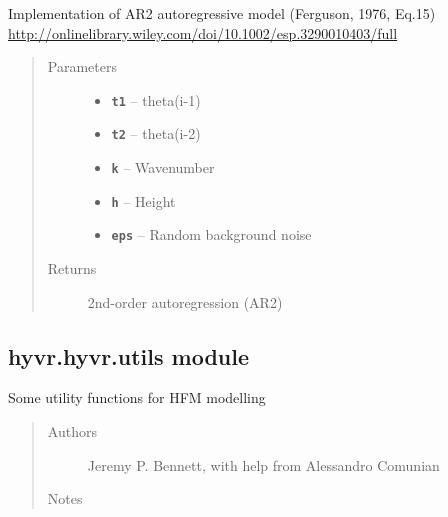 \documentclass[letterpaper,10pt,english]{sphinxmanual}
\begin{document}
\begin{fulllineitems}
\label{hyvr:hyvr.hyvr.sim.thetaAR2}
Implementation of AR2 autoregressive model (Ferguson, 1976, Eq.15)
\url{http://onlinelibrary.wiley.com/doi/10.1002/esp.3290010403/full}
\begin{quote}\begin{description}
\item[{Parameters}] \leavevmode\begin{itemize}
\item {} 
\textbf{\texttt{t1}} -- theta(i-1)

\item {} 
\textbf{\texttt{t2}} -- theta(i-2)

\item {} 
\textbf{\texttt{k}} -- Wavenumber

\item {} 
\textbf{\texttt{h}} -- Height

\item {} 
\textbf{\texttt{eps}} -- Random background noise

\end{itemize}

\item[{Returns}] \leavevmode
2nd-order autoregression (AR2)

\end{description}\end{quote}

\end{fulllineitems}



\subsection{hyvr.hyvr.utils module}
\label{hyvr:module-hyvr.hyvr.utils}\label{hyvr:hyvr-hyvr-utils-module}
Some utility functions for HFM modelling
\begin{quote}\begin{description}
\item[{Authors}] \leavevmode
Jeremy P. Bennett, with help from Alessandro Comunian

\item[{Notes}] \leavevmode
\end{description}\end{quote}
\end{document}
